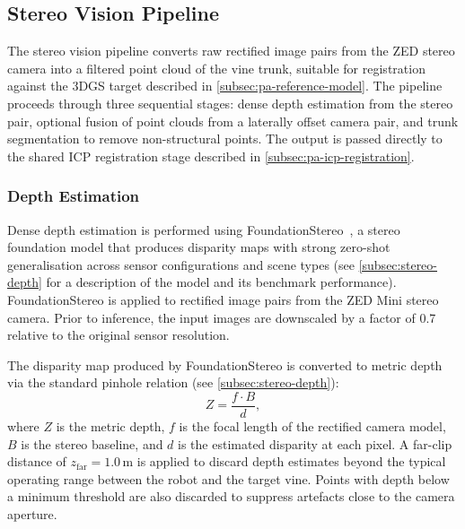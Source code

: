 \subsection{Stereo Vision Pipeline}
\label{subsec:pa-stereo-pipeline}

The stereo vision pipeline converts raw rectified image pairs from the ZED stereo camera into a filtered point cloud of the vine trunk, suitable for registration against the 3DGS target described in \cref{subsec:pa-reference-model}. The pipeline proceeds through three sequential stages: dense depth estimation from the stereo pair, optional fusion of point clouds from a laterally offset camera pair, and trunk segmentation to remove non-structural points. The output is passed directly to the shared ICP registration stage described in \cref{subsec:pa-icp-registration}.

\subsubsection{Depth Estimation}
\label{subsubsec:pa-depth-estimation}

Dense depth estimation is performed using FoundationStereo~\cite{wenFoundationStereoZeroShot2025},
a stereo foundation model that produces disparity maps with strong zero-shot generalisation across sensor configurations and scene types (see \cref{subsec:stereo-depth} for a description of the model and its benchmark performance). %
FoundationStereo is applied to rectified image pairs from the ZED Mini stereo camera. Prior to inference, the input images are downscaled by a factor of 0.7 relative to the original sensor resolution.

The disparity map produced by FoundationStereo is converted to metric depth via the standard pinhole relation (see \cref{subsec:stereo-depth}):
%
\begin{equation}
    Z = \frac{f \cdot B}{d},
\end{equation}
%
where $Z$ is the metric depth, $f$ is the focal length of the rectified camera model, $B$ is the stereo baseline, and $d$ is the estimated disparity at each pixel. A far-clip distance of $z_\mathrm{far} = 1.0$\,m is applied to discard depth estimates beyond the typical operating range between the robot and the target vine.
Points with depth below a minimum threshold are also discarded to suppress artefacts close to the camera aperture.


